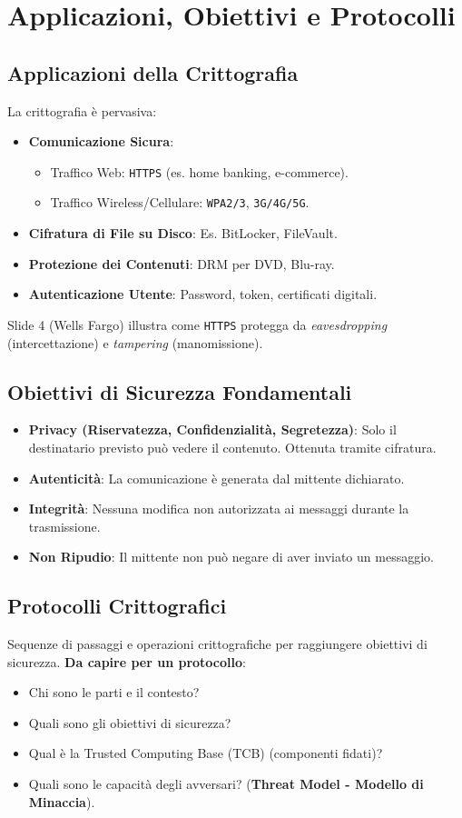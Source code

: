 \section{Applicazioni, Obiettivi e Protocolli}

\subsection{Applicazioni della Crittografia}
La crittografia è pervasiva:
\begin{itemize}
    \item \textbf{Comunicazione Sicura}:
    \begin{itemize}
        \item Traffico Web: \texttt{HTTPS} (es. home banking, e-commerce).
        \item Traffico Wireless/Cellulare: \texttt{WPA2/3}, \texttt{3G/4G/5G}.
    \end{itemize}
    \item \textbf{Cifratura di File su Disco}: Es. BitLocker, FileVault.
    \item \textbf{Protezione dei Contenuti}: DRM per DVD, Blu-ray.
    \item \textbf{Autenticazione Utente}: Password, token, certificati digitali.
\end{itemize}
Slide 4 (Wells Fargo) illustra come \texttt{HTTPS} protegga da \textit{eavesdropping} (intercettazione) e \textit{tampering} (manomissione).

\subsection{Obiettivi di Sicurezza Fondamentali}
\begin{itemize}
    \item \textbf{Privacy (Riservatezza, Confidenzialità, Segretezza)}: Solo il destinatario previsto può vedere il contenuto. Ottenuta tramite cifratura.
    \item \textbf{Autenticità}: La comunicazione è generata dal mittente dichiarato.
    \item \textbf{Integrità}: Nessuna modifica non autorizzata ai messaggi durante la trasmissione.
    \item \textbf{Non Ripudio}: Il mittente non può negare di aver inviato un messaggio.
\end{itemize}

\subsection{Protocolli Crittografici}
Sequenze di passaggi e operazioni crittografiche per raggiungere obiettivi di sicurezza.
\textbf{Da capire per un protocollo}:
\begin{itemize}
    \item Chi sono le parti e il contesto?
    \item Quali sono gli obiettivi di sicurezza?
    \item Qual è la Trusted Computing Base (TCB) (componenti fidati)?
    \item Quali sono le capacità degli avversari? (\textbf{Threat Model - Modello di Minaccia}).
\end{itemize}

